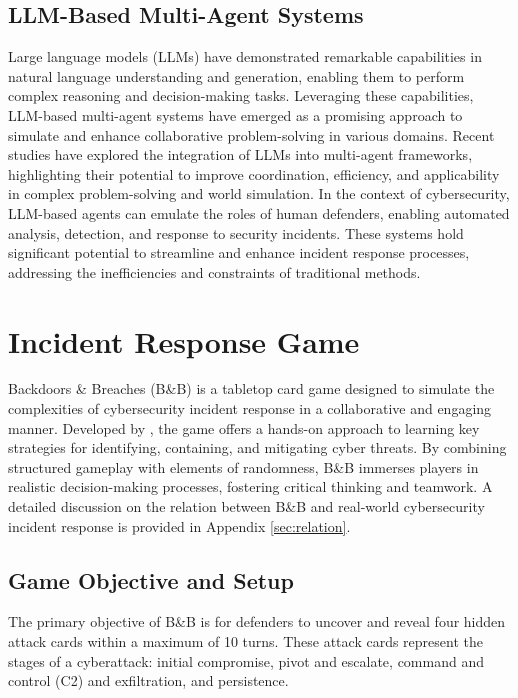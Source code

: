 \documentclass[letterpaper]{article} %
\begin{document}
\subsection{LLM-Based Multi-Agent Systems}

Large language models (LLMs) \citep{kaddour2023challenges} have demonstrated remarkable capabilities in natural language understanding and generation, enabling them to perform complex reasoning and decision-making tasks. Leveraging these capabilities, LLM-based multi-agent systems have emerged as a promising approach to simulate and enhance collaborative problem-solving in various domains. Recent studies \citep{talebirad2023multi,li2023theory,guo2024large,wang2024survey} have explored the integration of LLMs into multi-agent frameworks, highlighting their potential to improve coordination, efficiency, and applicability in complex problem-solving and world simulation. In the context of cybersecurity, LLM-based agents can emulate the roles of human defenders, enabling automated analysis, detection, and response to security incidents. These systems hold significant potential to streamline and enhance incident response processes, addressing the inefficiencies and constraints of traditional methods.

\section{Incident Response Game}

Backdoors \& Breaches (B\&B) is a tabletop card game designed to simulate the complexities of cybersecurity incident response in a collaborative and engaging manner. Developed by \citet{backdoorsandbreaches}, the game offers a hands-on approach to learning key strategies for identifying, containing, and mitigating cyber threats. By combining structured gameplay with elements of randomness, B\&B immerses players in realistic decision-making processes, fostering critical thinking and teamwork. A detailed discussion on the relation between B\&B and real-world cybersecurity incident response is provided in Appendix \ref{sec:relation}.

\subsection{Game Objective and Setup}

The primary objective of B\&B is for defenders to uncover and reveal four hidden attack cards within a maximum of 10 turns. These attack cards represent the stages of a cyberattack: initial compromise, pivot and escalate, command and control (C2) and exfiltration, and persistence.
\end{document}
